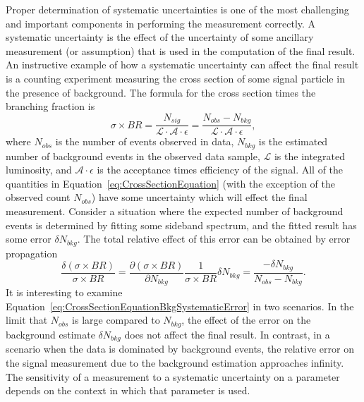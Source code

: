 Proper determination of systematic uncertainties is one of the most challenging
and important components in performing the measurement correctly.  A systematic
uncertainty is the effect of the uncertainty of some ancillary measurement (or
assumption) that is used in the computation of the final result.  An instructive
example of how a systematic uncertainty can affect the final result is a
counting experiment measuring the cross section of some signal particle in the
presence of background.  The formula for the cross section times the branching
fraction is
\begin{equation}
  \sigma \times BR = \frac{N_{sig}}{\mathcal{L} \cdot \mathcal {A} \cdot
  \epsilon} = \frac{N_{obs}-N_{bkg}}{\mathcal{L} \cdot \mathcal {A} \cdot
  \epsilon}, \label{eq:CrossSectionEquation}
\end{equation}
where $N_{obs}$ is the number of events observed in data, $N_{bkg}$ is the
estimated number of background events in the observed data sample, $\mathcal{L}$
is the integrated luminosity, and $\mathcal{A} \cdot \epsilon$ is the acceptance
times efficiency of the signal.  All of the quantities in
Equation~\ref{eq:CrossSectionEquation} (with the exception of the observed
count $N_{obs}$) have some uncertainty which will effect the final measurement.
Consider a situation where the expected number of background events is
determined by fitting some sideband spectrum, and the fitted result has some
error $\delta N_{bkg}$.  The total relative effect of this error can
be obtained by error propagation
\begin{equation}
  \frac{\delta (\sigma \times BR)}{\sigma \times BR} = \frac{\partial(\sigma
  \times BR)}{\partial N_{bkg}}  \frac{1}{\sigma \times BR} \delta N_{bkg} =
  \frac{-\delta N_{bkg}} {N_{obs}-N_{bkg}}.
  \label{eq:CrossSectionEquationBkgSystematicError}
\end{equation}
It is interesting to examine
Equation~\ref{eq:CrossSectionEquationBkgSystematicError} in two scenarios.  In
the limit that $N_{obs}$ is large compared to $N_{bkg}$, the effect of the error
on the background estimate $\delta N_{bkg}$ does not affect the final result.
In contrast, in a scenario when the data is dominated by background events, the
relative error on the signal measurement due to the background estimation
approaches infinity.  The sensitivity of a measurement to a systematic
uncertainty on a parameter depends on the context in which that parameter is
used.

